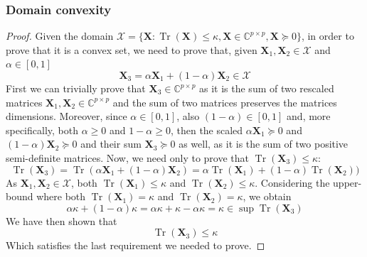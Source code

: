 \documentclass[12pt]{article}
\DeclareMathOperator*{\tr}{Tr}
\newcommand{\boldX}{\mathbf{X}}
\newcommand{\setX}{\mathcal{X}}
\begin{document}
\subsubsection{Domain convexity}
\begin{proof}
Given the domain $\setX = \{ \boldX : \tr(\boldX) \leq \kappa, \boldX \in \mathbb{C}^{p \times p}, \boldX \succeq 0 \}$, in order to prove that it is a convex set, we need to prove that, given $\boldX_1, \boldX_2 \in \setX$ and $\alpha \in [0,1]$
\begin{equation}
    \boldX_3 = \alpha \boldX_1 + (1 - \alpha) \boldX_2 \in \setX
\end{equation}
First we can trivially prove that $\boldX_3 \in \mathbb{C}^{p \times p}$ as it is the sum of two rescaled matrices $\boldX_1, \boldX_2 \in \mathbb{C}^{p \times p}$ and the sum of two matrices preserves the matrices dimensions. Moreover, since $\alpha \in [0, 1]$, also $(1 - \alpha) \in [0, 1]$ and, more specifically, both $\alpha \geq 0$ and $1 - \alpha \geq 0$, then the scaled $\alpha\boldX_1 \succeq 0$ and $(1 - \alpha) \boldX_2 \succeq 0$ and their sum $\boldX_3 \succeq 0$ as well, as it is the sum of two positive semi-definite matrices. Now, we need only to prove that $\tr(\boldX_3) \leq \kappa$:
\begin{equation}
    \tr(\boldX_3) = \tr(\alpha \boldX_1 + (1 - \alpha) \boldX_2) = \alpha \tr(\boldX_1) + (1 - \alpha) \tr(\boldX_2))
\end{equation}
As $\boldX_1, \boldX_2 \in \setX$, both $\tr(\boldX_1) \leq \kappa$ and $\tr(\boldX_2) \leq \kappa$. Considering the upper-bound where both $\tr(\boldX_1) = \kappa$ and $\tr(\boldX_2) = \kappa$, we obtain
\begin{equation}
    \alpha \kappa + (1 - \alpha)\kappa = \alpha \kappa + \kappa - \alpha \kappa = \kappa \in \sup \tr(\boldX_3)
\end{equation}
We have then shown that
\begin{equation}
    \tr(\boldX_3) \leq \kappa
\end{equation}
Which satisfies the last requirement we needed to prove.
\end{proof}
\end{document}

